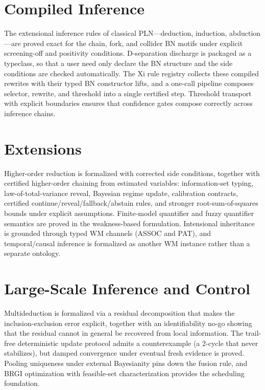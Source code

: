\documentclass[11pt,openany]{report}
\begin{document}
\section{Compiled Inference}

The extensional inference rules of classical PLN---deduction, induction,
abduction---are proved exact for the chain, fork, and collider BN motifs
under explicit screening-off and positivity conditions.  D-separation
discharge is packaged as a typeclass, so that a user need only declare the
BN structure and the side conditions are checked automatically.  The Xi
rule registry collects these compiled rewrites with their typed BN
constructor lifts, and a one-call pipeline composes selector, rewrite, and
threshold into a single certified step.  Threshold transport with
explicit boundaries ensures that confidence gates compose correctly
across inference chains.

\section{Extensions}

Higher-order reduction is formalized with corrected side conditions,
together with certified higher-order chaining from estimated variables:
information-set typing, law-of-total-variance reveal, Bayesian regime
update, calibration contracts, certified continue/reveal/fallback/abstain
rules, and stronger root-sum-of-squares bounds under explicit
assumptions.  Finite-model quantifier and fuzzy quantifier semantics
are proved in the weakness-based formulation.  Intensional inheritance
is grounded through typed WM channels (ASSOC and PAT), and
temporal/causal inference is formalized as another WM instance rather than
a separate ontology.

\section{Large-Scale Inference and Control}

Multideduction is formalized via a residual decomposition that makes the
inclusion-exclusion error explicit, together with an identifiability no-go
showing that the residual cannot in general be recovered from local
information.  The trail-free deterministic update protocol admits a
counterexample (a 2-cycle that never stabilizes), but damped convergence
under eventual fresh evidence is proved.  Pooling uniqueness under
external Bayesianity pins down the fusion rule, and BRGI optimization
with feasible-set characterization provides the scheduling foundation.
\end{document}
